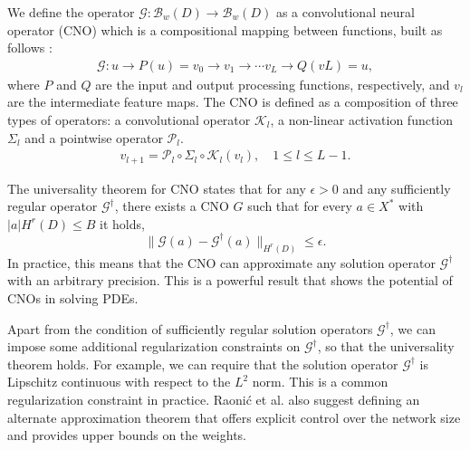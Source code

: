 \documentclass[unicode,11pt,a4paper,oneside,numbers=endperiod,openany]{scrartcl}
\begin{document}
We define the operator $\mathcal{G}: \mathcal{B}_w(D) \to \mathcal{B}_w(D)$ as a
convolutional neural operator (CNO) which is a compositional mapping between
functions, built as follows \cite{raonic2023convolutional}
:
\begin{align}
    \mathcal{G} :u\to P(u)=v_0 \to v_1 \to \cdots v_L \to Q(vL)=u,
\end{align}
where $P$ and $Q$ are the input and output processing functions, respectively, and $v_l$ are the intermediate feature maps. The CNO is defined as a composition of three types of operators: a convolutional operator $\mathcal{K}_l$, a non-linear activation function $\Sigma_l$ and a pointwise operator $\mathcal{P}_l$.
\begin{align}
     v_{l+1} =\mathcal{P}_l \circ
    \Sigma_l
    \circ \mathcal{K}_l(v_l), \quad 1\leq l\leq L-1.
\end{align}


The universality theorem for CNO states that for any $\epsilon > 0$ and any
sufficiently regular operator $\mathcal{G}^{\dagger}$,
there exists a CNO $G$ such that for every $a \in X^*$ with $|a|H^r(D) \leq B$
it holds,
\begin{equation}
    \|\mathcal{G}(a) - \mathcal{G}^{\dagger}(a)\|_{H^r(D)} \leq \epsilon.
\end{equation}
In practice, this means that the CNO can approximate any solution operator
$\mathcal{G}^{\dagger}$ with an arbitrary precision. This is a powerful result that shows the potential of CNOs in solving PDEs.

Apart from the condition of sufficiently regular solution operators
$\mathcal{G}^{\dagger}$, we can impose some additional regularization
constraints on $\mathcal{G}^{\dagger}$, so that the universality theorem holds.
For example, we can require that the solution operator $\mathcal{G}^{\dagger}$
is Lipschitz continuous with respect to the $L^2$ norm. This is a common
regularization constraint in practice. Raonić et al.
\cite{raonic2023convolutional} also suggest defining an alternate approximation theorem that offers explicit control over the network size and provides upper bounds on the weights.



\end{document}
